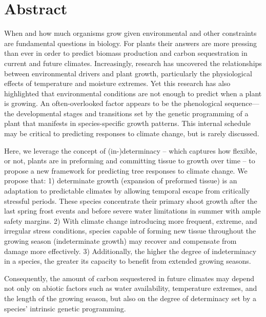 \documentclass{article}
\begin{document}
\section*{Abstract} %
	When and how much organisms grow given environmental and other constraints are fundamental questions in biology. For plants their answers are more pressing than ever in order to predict biomass production and carbon sequestration in current and future climates. Increasingly, research has uncovered the relationships between environmental drivers and plant growth, particularly the physiological effects of temperature and moisture extremes. Yet this research has also highlighted that environmental conditions are not enough to predict when a plant is growing. An often-overlooked factor appears to be the phenological sequence---the developmental stages and transitions set by the genetic programming of a plant that manifests in species-specific growth patterns. This internal schedule may be critical to predicting responses to climate change, but is rarely discussed. 
	
	Here, we leverage the concept of (in-)determinacy -- which captures how flexible, or not, plants are in preforming and committing tissue to growth over time -- to propose a new framework for predicting tree responses to climate change. We propose that: 1) determinate growth (expansion of preformed tissue) is an adaptation to predictable climates by allowing temporal escape from critically stressful periods. These species concentrate their primary shoot growth after the last spring frost events and before severe water limitations in summer with ample safety margins.  2) With climate change introducing more frequent, extreme, and irregular stress conditions, species capable of forming new tissue throughout the growing season (indeterminate growth) may recover and compensate from damage more effectively. 3) Additionally, the higher the degree of indeterminacy in a species, the greater its capacity to benefit from extended growing seasons. 
	
	Consequently, the amount of carbon sequestered in future climates may depend not only on abiotic factors such as water availability, temperature extremes, and the length of the growing season, but also on the degree of determinacy set by a species' intrinsic genetic programming.\\
		
\end{document}
